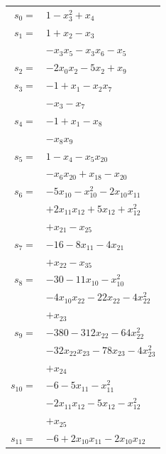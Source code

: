 \begingroup
\small
\setlength{\tabcolsep}{2pt}
\setlength{\LTleft}{0pt}
\begin{longtable}{@{}r@{\;}l@{}}
\(s_{0}=\) & \(\displaystyle 1 -x_{3}^{2} +x_{4}\) \\[3pt]
\(s_{1}=\) & \(\displaystyle 1 +x_{2} -x_{3}\) \\
 & \(\displaystyle -x_{3}x_{5} -x_{3}x_{6} -x_{5}\) \\[3pt]
\(s_{2}=\) & \(\displaystyle -2x_{0}x_{2} -5x_{2} +x_{9}\) \\[3pt]
\(s_{3}=\) & \(\displaystyle -1 +x_{1} -x_{2}x_{7}\) \\
 & \(\displaystyle -x_{3} -x_{7}\) \\[3pt]
\(s_{4}=\) & \(\displaystyle -1 +x_{1} -x_{8}\) \\
 & \(\displaystyle -x_{8}x_{9}\) \\[3pt]
\(s_{5}=\) & \(\displaystyle 1 -x_{4} -x_{5}x_{20}\) \\
 & \(\displaystyle -x_{6}x_{20} +x_{18} -x_{20}\) \\[3pt]
\(s_{6}=\) & \(\displaystyle -5x_{10} -x_{10}^{2} -2x_{10}x_{11}\) \\
 & \(\displaystyle +2x_{11}x_{12} +5x_{12} +x_{12}^{2}\) \\
 & \(\displaystyle +x_{21} -x_{25}\) \\[3pt]
\(s_{7}=\) & \(\displaystyle -16 -8x_{11} -4x_{21}\) \\
 & \(\displaystyle +x_{22} -x_{35}\) \\[3pt]
\(s_{8}=\) & \(\displaystyle -30 -11x_{10} -x_{10}^{2}\) \\
 & \(\displaystyle -4x_{10}x_{22} -22x_{22} -4x_{22}^{2}\) \\
 & \(\displaystyle +x_{23}\) \\[3pt]
\(s_{9}=\) & \(\displaystyle -380 -312x_{22} -64x_{22}^{2}\) \\
 & \(\displaystyle -32x_{22}x_{23} -78x_{23} -4x_{23}^{2}\) \\
 & \(\displaystyle +x_{24}\) \\[3pt]
\(s_{10}=\) & \(\displaystyle -6 -5x_{11} -x_{11}^{2}\) \\
 & \(\displaystyle -2x_{11}x_{12} -5x_{12} -x_{12}^{2}\) \\
 & \(\displaystyle +x_{25}\) \\[3pt]
\(s_{11}=\) & \(\displaystyle -6 +2x_{10}x_{11} -2x_{10}x_{12}\) \\

\end{longtable}

